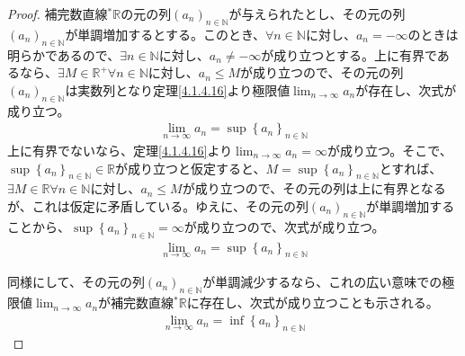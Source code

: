 \documentclass[dvipdfmx]{jsarticle}
\begin{document}
\begin{proof}
補完数直線${}^{*}\mathbb{R}$の元の列$\left( a_{n} \right)_{n \in \mathbb{N}}$が与えられたとし、その元の列$\left( a_{n} \right)_{n \in \mathbb{N}}$が単調増加するとする。このとき、$\forall n \in \mathbb{N}$に対し、$a_{n} = - \infty$のときは明らかであるので、$\exists n \in \mathbb{N}$に対し、$a_{n} \neq - \infty$が成り立つとする。上に有界であるなら、$\exists M \in \mathbb{R}^{+}\forall n \in \mathbb{N}$に対し、$a_{n} \leq M$が成り立つので、その元の列$\left( a_{n} \right)_{n \in \mathbb{N}}$は実数列となり定理\ref{4.1.4.16}より極限値$\lim_{n \rightarrow \infty}a_{n}$が存在し、次式が成り立つ。
\begin{align*}
\lim_{n \rightarrow \infty}a_{n} = \sup\left\{ a_{n} \right\}_{n \in \mathbb{N}}
\end{align*}
上に有界でないなら、定理\ref{4.1.4.16}より$\lim_{n \rightarrow \infty}a_{n} = \infty$が成り立つ。そこで、$\sup\left\{ a_{n} \right\}_{n \in \mathbb{N}} \in \mathbb{R}$が成り立つと仮定すると、$M = \sup\left\{ a_{n} \right\}_{n \in \mathbb{N}}$とすれば、$\exists M \in \mathbb{R}\forall n \in \mathbb{N}$に対し、$a_{n} \leq M$が成り立つので、その元の列は上に有界となるが、これは仮定に矛盾している。ゆえに、その元の列$\left( a_{n} \right)_{n \in \mathbb{N}}$が単調増加することから、$\sup\left\{ a_{n} \right\}_{n \in \mathbb{N}} = \infty$が成り立つので、次式が成り立つ。
\begin{align*}
\lim_{n \rightarrow \infty}a_{n} = \sup\left\{ a_{n} \right\}_{n \in \mathbb{N}}
\end{align*}\par
同様にして、その元の列$\left( a_{n} \right)_{n \in \mathbb{N}}$が単調減少するなら、これの広い意味での極限値$\lim_{n \rightarrow \infty}a_{n}$が補完数直線${}^{*}\mathbb{R}$に存在し、次式が成り立つことも示される。
\begin{align*}
\lim_{n \rightarrow \infty}a_{n} = \inf\left\{ a_{n} \right\}_{n \in \mathbb{N}}
\end{align*}
\end{proof}
\end{document}
